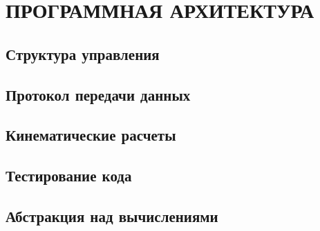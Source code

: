 \chapter{\MakeUppercase{Программная архитектура}}
\section{Структура управления}

\section{Протокол передачи данных} \label{sec:protocol}

\section{Кинематические расчеты}

\section{Тестирование кода}

\section{Абстракция над вычислениями}
